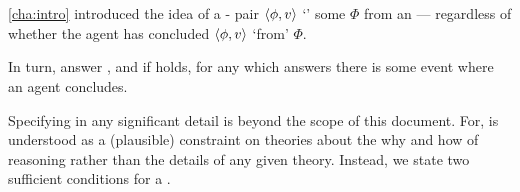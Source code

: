 \chapter{}
\label{cha:ros}


\begin{note}
  \autoref{cha:intro} introduced the idea of a - pair \(\langle\phi, v\rangle\) `\fingf{}' some \pool{} \(\Phi\) from an \agpe{} --- regardless of whether the agent has concluded \(\langle\phi, v\rangle\) `from' \(\Phi\).

  In turn,  answer \qWhy{}, and if \issueInclusion{} holds, for any \fingfr{} which answers \qWhy{} there is some event where an agent concludes.

  Specifying \fingfr{} in any significant detail is beyond the scope of this document.
  For, \issueInclusion{} is understood as a (plausible) constraint on theories about the why and how of reasoning rather than the details of any given theory.
  Instead, we state two sufficient conditions for a \fingfr{}.
\end{note}


\section{\supportI{}}
\label{cha:ros:I}



